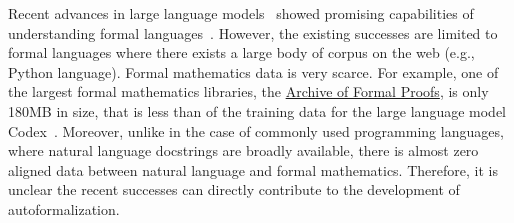 \documentclass{article}
\begin{document}
Recent advances in large language models~\citep{brown2020gpt3, chowdhery2022palm} showed promising capabilities of understanding formal languages~\citep{chen2021codex, Li2022alphacode}. However, the existing successes are limited to formal languages where there exists a large body of corpus on the web (e.g., Python language). Formal mathematics data is very scarce. For example, one of the largest formal mathematics libraries, the \href{https://www.isa-afp.org}{Archive of Formal Proofs}, is only 180MB in size, that is less than  of the training data for the large language model Codex~\citep{chen2021codex}. Moreover, unlike in the case of commonly used programming languages, where natural language docstrings are broadly available, there is almost zero aligned data between natural language and formal mathematics. Therefore, it is unclear the recent successes can directly contribute to the development of autoformalization.
\end{document}
